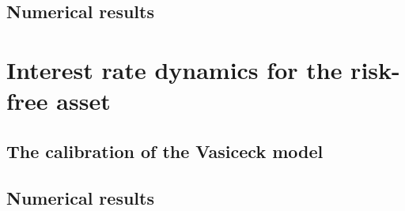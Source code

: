 


\subsection{Numerical results}

\section{Interest rate dynamics for the risk-free asset}\label{sec:Interest_rate_dynamics}

\subsection{The calibration of the Vasiceck model}
\subsection{Numerical results}





